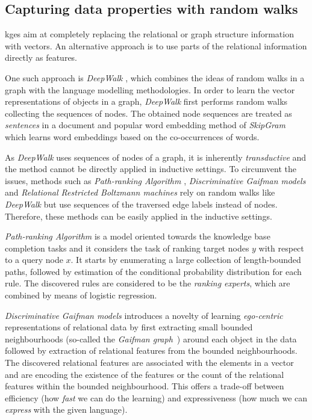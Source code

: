 \subsection{Capturing data properties with random walks}


\gls{kge}s aim at completely replacing the relational or graph structure information with vectors.
An alternative approach is to use parts of the relational information directly as features.


One such approach is \textit{DeepWalk} \cite{Perozzi:2014:DOL:2623330.2623732}, which combines the ideas of random walks in a graph with the language modelling methodologies.
In order to learn the vector representations of objects in a graph, \textit{DeepWalk} first performs random walks collecting the sequences of nodes.
The obtained node sequences are treated as \textit{sentences} in a document and popular word embedding method of  \textit{SkipGram} \cite{NIPS2013_Skipgram} which learns word embeddings based on the co-occurrences of words.



As \textit{DeepWalk} uses sequences of nodes of a graph, it is inherently \textit{transductive} and the method cannot be directly applied in inductive settings.
To circumvent the issues, methods such as \textit{Path-ranking Algorithm} \cite{lao2010pra,Lao:2011:RWI:2145432.2145494}, \textit{Discriminative Gaifman models} \cite{Niepert:2016:DGM:3157382.3157479} and \textit{Relational Restricted Boltzmann machines} \cite{KaurILP17} rely on random walks like \textit{DeepWalk} but use sequences of the traversed edge labels instead of nodes.
Therefore, these methods can be easily applied in the inductive settings.



\textit{Path-ranking Algorithm} is a model oriented towards the knowledge base completion tasks and it considers the task of ranking target nodes $y$ with respect to a query node $x$.
It starts by enumerating a large collection of length-bounded paths, followed by estimation of the conditional probability distribution for each rule.
The discovered rules are considered to be the \textit{ranking experts}, which are combined by means of logistic regression.




\textit{Discriminative Gaifman models} introduces a novelty of learning \textit{ego-centric} representations of relational data by first extracting small bounded neighbourhoods (so-called the \textit{Gaifman graph}~\cite{GAIFMAN1982105}) around each object in the data followed by extraction of relational features from the bounded neighbourhoods.
The discovered relational features are associated with the elements in a vector and are encoding the existence of the features or the count of the relational features within the bounded neighbourhood.
This offers a trade-off between efficiency (how \textit{fast} we can do the learning) and expressiveness (how much we can \textit{express} with the given language).



